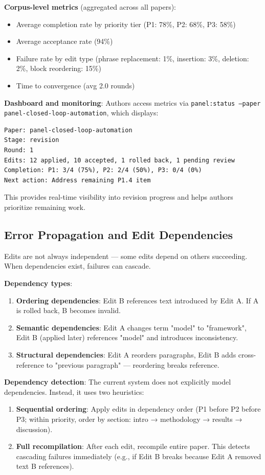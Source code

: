 \textbf{Corpus-level metrics} (aggregated across all papers):
\begin{itemize}
\item Average completion rate by priority tier (P1: 78\%, P2: 68\%, P3: 58\%)
\item Average acceptance rate (94\%)
\item Failure rate by edit type (phrase replacement: 1\%, insertion: 3\%, deletion: 2\%, block reordering: 15\%)
\item Time to convergence (avg 2.0 rounds)
\end{itemize}

\textbf{Dashboard and monitoring}: Authors access metrics via \texttt{panel:status --paper panel-closed-loop-automation}, which displays:
\begin{verbatim}
Paper: panel-closed-loop-automation
Stage: revision
Round: 1
Edits: 12 applied, 10 accepted, 1 rolled back, 1 pending review
Completion: P1: 3/4 (75%), P2: 2/4 (50%), P3: 0/4 (0%)
Next action: Address remaining P1.4 item
\end{verbatim}

This provides real-time visibility into revision progress and helps authors prioritize remaining work.

\subsection{Error Propagation and Edit Dependencies}

Edits are not always independent — some edits depend on others succeeding. When dependencies exist, failures can cascade.

\textbf{Dependency types}:
\begin{enumerate}
\item \textbf{Ordering dependencies}: Edit B references text introduced by Edit A. If A is rolled back, B becomes invalid.
\item \textbf{Semantic dependencies}: Edit A changes term "model" to "framework", Edit B (applied later) references "model" and introduces inconsistency.
\item \textbf{Structural dependencies}: Edit A reorders paragraphs, Edit B adds cross-reference to "previous paragraph" — reordering breaks reference.
\end{enumerate}

\textbf{Dependency detection}: The current system does not explicitly model dependencies. Instead, it uses two heuristics:
\begin{enumerate}
\item \textbf{Sequential ordering}: Apply edits in dependency order (P1 before P2 before P3; within priority, order by section: intro → methodology → results → discussion).
\item \textbf{Full recompilation}: After each edit, recompile entire paper. This detects cascading failures immediately (e.g., if Edit B breaks because Edit A removed text B references).
\end{enumerate}

